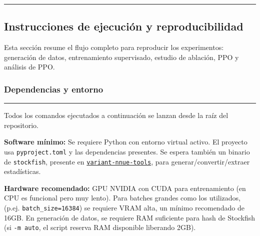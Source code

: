 \documentclass[12pt, a4paper]{article}
\begin{document}
\rule{\textwidth}{0.2pt}
\subsection{Instrucciones de ejecución y reproducibilidad}\label{sec:anexo_reproducibilidad}

Esta sección resume el flujo completo para reproducir los experimentos: generación de datos, entrenamiento supervisado, estudio de ablación, PPO y análisis de PPO.

\subsubsection*{Dependencias y entorno}

\rule{\textwidth}{0.2pt}
Todos los comandos ejecutados a continuación se lanzan desde la raíz del repositorio.

\textbf{Software mínimo:}
Se requiere Python con entorno virtual activo. El proyecto usa \texttt{pyproject.toml} y las dependencias presentes.
Se espera también un binario de \texttt{stockfish}, presente en \href{https://github.com/fairy-stockfish/variant-nnue-tools}{\texttt{variant-nnue-tools}}, para generar/convertir/extraer estadísticas.

\textbf{Hardware recomendado:}
GPU NVIDIA con CUDA para entrenamiento (en CPU es funcional pero muy lento). Para batches grandes como los utilizados, (p.ej. \texttt{batch\_size=16384}) se requiere VRAM alta, un mínimo recomendado de 16GB.
En generación de datos, se requiere RAM suficiente para hash de Stockfish (si \texttt{-m auto}, el script reserva RAM disponible liberando 2GB).
\end{document}
